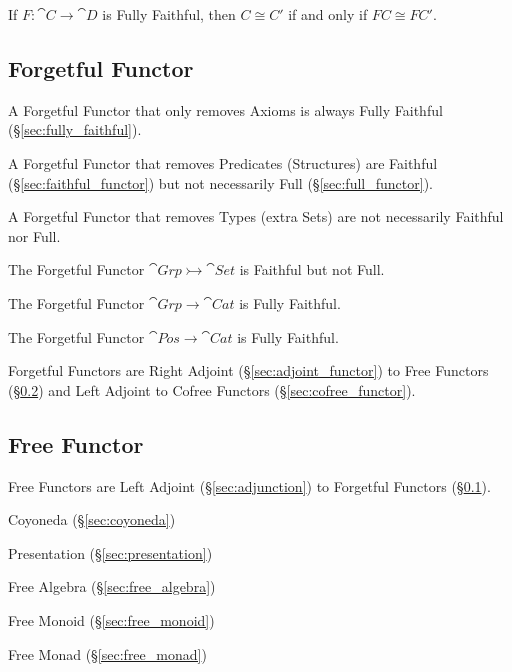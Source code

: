 If $F : \cat{C} \rightarrow \cat{D}$ is Fully Faithful, then $C
\cong C'$ if and only if $FC \cong FC'$.



\subsection{Forgetful Functor}\label{sec:forgetful_functor}

A Forgetful Functor that only removes Axioms is always Fully Faithful
(\S\ref{sec:fully_faithful}).

A Forgetful Functor that removes Predicates (Structures) are Faithful
(\S\ref{sec:faithful_functor}) but not necessarily Full
(\S\ref{sec:full_functor}).

A Forgetful Functor that removes Types (extra Sets) are not
necessarily Faithful nor Full.

The Forgetful Functor $\cat{Grp} \rightarrowtail \cat{Set}$ is
Faithful but not Full.

The Forgetful Functor $\cat{Grp} \rightarrow \cat{Cat}$ is
Fully Faithful.

The Forgetful Functor $\cat{Pos} \rightarrow \cat{Cat}$ is
Fully Faithful.

Forgetful Functors are Right Adjoint (\S\ref{sec:adjoint_functor}) to
Free Functors (\S\ref{sec:free_functor}) and Left Adjoint to Cofree
Functors (\S\ref{sec:cofree_functor}).



\subsection{Free Functor}\label{sec:free_functor}

Free Functors are Left Adjoint (\S\ref{sec:adjunction}) to Forgetful
Functors (\S\ref{sec:forgetful_functor}).

Coyoneda (\S\ref{sec:coyoneda})

Presentation (\S\ref{sec:presentation})

Free Algebra (\S\ref{sec:free_algebra})

Free Monoid (\S\ref{sec:free_monoid})

Free Monad (\S\ref{sec:free_monad})


